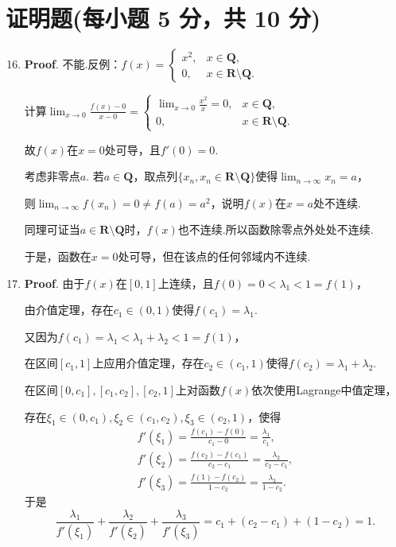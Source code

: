 \documentclass[../main.tex]{subfiles}
\begin{document}
\section{证明题(每小题 5 分，共 10 分)}
\begin{enumerate}
    \setcounter{enumi}{15}
    \item \textbf{Proof}. 不能.反例：$f(x)=
              \begin{cases}
                  x^{2}, & x\in\mathbf{Q},                    \\
                  0,     & x\in\mathbf{R}\setminus\mathbf{Q}.
              \end{cases}$

          计算$\lim_{x\to0}\frac{f(x)-0}{x-0}=
              \begin{cases}
                  \lim_{x\to0}\frac{x^2}{x}=0, & x\in\mathbf{Q},                    \\
                  0,                           & x\in\mathbf{R}\setminus\mathbf{Q}.
              \end{cases}$

          故$f(x)$在$x=0$处可导，且$f'(0)=0$.

          考虑非零点$a$. 若$a\in\mathbf{Q}$，取点列$\{x_{n},x_{n}\in\mathbf{R}\setminus
              \mathbf{Q}\}$使得$\lim_{n\to\infty}x_{n}=a$，

          则$\lim_{n\to\infty}f(x_{n})=0\neq f(a)=a^{2}$，说明$f(x)$在$x=a$处不连续.

          同理可证当$a\in\mathbf{R}\setminus\mathbf{Q}$时，$f(x)$也不连续.所以函数除零点外处处不连续.

          于是，函数在$x=0$处可导，但在该点的任何邻域内不连续.

    \item \textbf{Proof}. 由于$f(x)$在$[0,1]$上连续，且$f(0)=0 < \lambda_{1}
              < 1=f(1)$，

          由介值定理，存在$c_{1}\in(0,1)$使得$f(c_{1})=\lambda_{1}$.

          又因为$f(c_{1})=\lambda_{1} < \lambda_{1}+\lambda_{2} < 1=f(1)$，

          在区间$[c_{1}, 1]$上应用介值定理，存在$c_{2}\in(c_{1},1)$使得$f(c_{2})=\lambda
              _{1}+\lambda_{2}$.

          在区间$[0,c_{1}],[c_{1},c_{2}],[c_{2},1]$上对函数$f(x)$依次使用Lagrange中值定理，

          存在$\xi_{1}\in(0,c_{1}),\xi_{2}\in(c_{1},c_{2}),\xi_{3}\in(c_{2},1)$，使得
          \[
              \begin{gathered}
                  f'(\xi_1)=\frac{f(c_{1})-f(0)}{c_{1}-0}=\frac{\lambda_{1}}{c_{1}}, \\
                  f'(\xi_2)=\frac{f(c_{2})-f(c_{1})}{c_{2}-c_{1}}=\frac{\lambda_{2}}{c_{2}-c_{1}},
                  \\
                  f'(\xi_3)=\frac{f(1)-f(c_{2})}{1-c_{2}}=\frac{\lambda_{3}}{1-c_{2}}.
              \end{gathered}
          \]
          于是
          \[
              \frac{\lambda_{1}}{f'(\xi_{1})}+\frac{\lambda_{2}}{f'(\xi_{2})}+\frac{\lambda_{3}}{f'(\xi_{3})}
              =c_{1}+(c_{2}-c_{1})+(1-c_{2})=1.
          \]
\end{enumerate}
\end{document}
